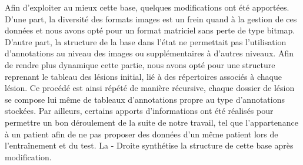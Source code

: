Afin d'exploiter au mieux cette base, quelques modifications ont été apportées. D'une part, la diversité des formats images est un frein quand à la gestion de ces données et nous avons opté pour un format matriciel sans perte de type bitmap. D'autre part, la structure de la base dans l'état ne permettait pas l'utilisation d'annotations au niveau des images ou supplémentaires à d'autres niveaux. Afin de rendre plus dynamique cette partie, nous avons opté pour une structure reprenant le tableau des lésions initial, lié à des répertoires associés à chaque lésion. Ce procédé est ainsi répété de manière récursive, chaque dossier de lésion se compose lui même de tableaux d'annotations propre au type d'annotations stockées. Par ailleurs, certains apports d'informations ont été réalisés pour permettre un bon déroulement de la suite de notre travail, tel que l'appartenance à un patient afin de ne pas proposer des données d'un même patient lors de l'entraînement et du test. La  - Droite synthétise la structure de cette base après modification.\par

